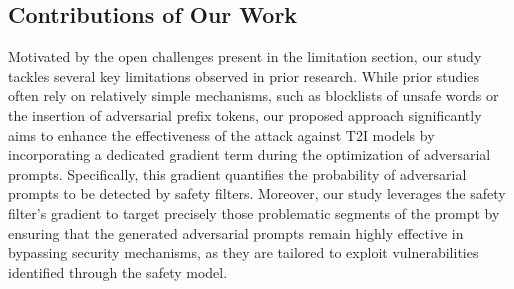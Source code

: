 \documentclass[acmsmall]{acmart}
\newcommand{\dalle}{DALL·E\xspace}
\newcommand{\imagen}{IMAGEN\xspace}
\begin{document}



\vspace{-0.4em}
\subsection{Contributions of Our Work\label{sec:detailedcontribution}} 
Motivated by the open challenges present in the limitation section, our study tackles several key limitations observed in prior research. While prior studies often rely on relatively simple mechanisms, such as blocklists of unsafe words or the insertion of adversarial prefix tokens, our proposed approach significantly aims to enhance the effectiveness of the attack against T2I models by incorporating a dedicated gradient term during the optimization of adversarial prompts. Specifically, this gradient quantifies the probability of adversarial prompts to be detected by safety filters. Moreover, our study leverages the safety filter's gradient to target precisely those problematic segments of the prompt by ensuring that the generated adversarial prompts remain highly effective in bypassing security mechanisms, as they are tailored to exploit vulnerabilities identified through the safety model.
\end{document}
